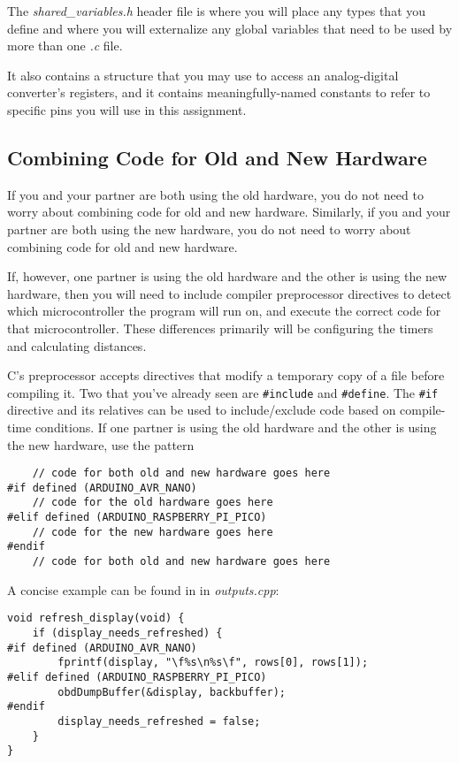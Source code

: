 The \textit{shared\_variables.h} header file is where you will place any types that you define and where you will externalize any global variables that need to be used by more than one \textit{.c} file.

It also contains a structure that you may use to access an analog-digital converter's registers,
and it contains meaningfully-named constants to refer to specific pins you will use in this assignment.


\subsection{Combining Code for Old and New Hardware}

If you and your partner are both using the old hardware, you do not need to worry about combining code for old and new hardware.
Similarly, if you and your partner are both using the new hardware, you do not need to worry about combining code for old and new hardware.

If, however, one partner is using the old hardware and the other is using the new hardware,
then you will need to include compiler preprocessor directives to detect which microcontroller the program will run on,
and execute the correct code for that microcontroller.
These differences primarily will be configuring the timers and calculating distances.

C's preprocessor accepts directives that modify a temporary copy of a file before compiling it.
Two that you've already seen are \lstinline{#include} and \lstinline{#define}.
The \lstinline{#if} directive and its relatives can be used to include/exclude code based on compile-time conditions.
If one partner is using the old hardware and the other is using the new hardware, use the pattern
\begin{lstlisting}
    // code for both old and new hardware goes here
#if defined (ARDUINO_AVR_NANO)
    // code for the old hardware goes here
#elif defined (ARDUINO_RASPBERRY_PI_PICO)
    // code for the new hardware goes here
#endif
    // code for both old and new hardware goes here
\end{lstlisting}

A concise example can be found in  in \textit{outputs.cpp}:

\begin{lstlisting}[firstnumber=108]
void refresh_display(void) {
    if (display_needs_refreshed) {
#if defined (ARDUINO_AVR_NANO)
        fprintf(display, "\f%s\n%s\f", rows[0], rows[1]);
#elif defined (ARDUINO_RASPBERRY_PI_PICO)
        obdDumpBuffer(&display, backbuffer);
#endif
        display_needs_refreshed = false;
    }
}
\end{lstlisting}

